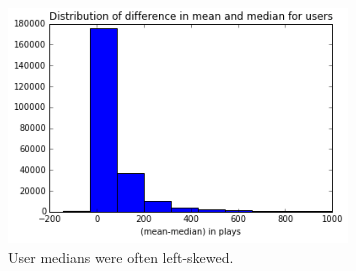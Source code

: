 \documentclass[11pt]{article}
\begin{document}
 \begin{figure}[t]
    \centering
    \includegraphics[width=9cm]{meanmedian}
    \caption{User medians were often left-skewed.}
    \label{fig:skew}
\end{figure}

 
\end{document}
